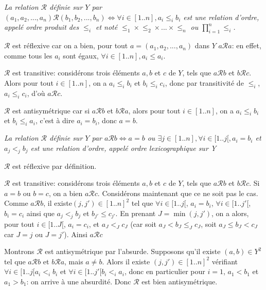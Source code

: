 \documentclass{scrartcl}
\begin{document}
			\prop \textsl{La relation $\mathcal{R}$ définie sur $Y$ par 
				$(a_1,a_2,...,a_n)\mathcal{R}(b_1,b_2,...,b_n) \Leftrightarrow \forall i \in [1..n], a_i\leq_i b_i$
				est une relation d'ordre, appelé ordre produit des $\leq_i$ et 
				noté $\leq_1\times\leq_2\times...\times\leq_n$ ou $\prod_{i=1}^n\leq_i$.}
			\begin{demo}
				\item $\mathcal{R}$ est réflexive car on a bien, pour tout $a = (a_1,a_2,...,a_n)$ dans $Y$
					$a\mathcal{R}a$: en effet, comme tous les $a_i$ sont égaux, $\forall i \in [1..n], a_i \leq a_i$.
				\item $\mathcal{R}$ est transitive: considérons trois éléments $a,b$ et $c$ de $Y$,
					tels que $a\mathcal{R}b$ et $b\mathcal{R}c$. Alors pour tout $i \in [1..n]$, on a $a_i\leq_i b_i$
					et $b_i \leq_i c_i$, donc par transitivité de $\leq_i$, $a_i\leq_i c_i$, d'où $a\mathcal{R}c$.
				\item $\mathcal{R}$ est antisymétrique car si $a\mathcal{R}b$ et $b\mathcal{R}a$,
					alors pour tout $i\in [1..n]$, on a $a_i \leq_i b_i$ et $b_i\leq_i a_i$, c'est à dire
					$a_i = b_i$, donc $a=b$.
			\end{demo}

			\prop \textsl{La relation $\mathcal{R}$ définie sur $Y$ par 
				$a\mathcal{R}b \Leftrightarrow a=b$ ou $\exists j \in [1..n], \forall i \in [1..j[, a_i = b_i$ et
				$a_j <_j b_j$
				est une relation d'ordre, appelé ordre lexicographique sur Y}
			\begin{demo}
				\item $\mathcal{R}$ est réflexive par définition.
				\item $\mathcal{R}$ est transitive: considérons trois éléments $a,b$ et $c$ de $Y$,
					tels que $a\mathcal{R}b$ et $b\mathcal{R}c$. Si $a=b$ ou $b=c$, on a bien $a\mathcal{R}c$.
					Considérons maintenant que ce ne soit pas le cas. Comme $a\mathcal{R}b$, il existe$(j,j')\in[1..n]^2$ tel que 
					$\forall i \in [1..j[$, $a_i = b_i$, $\forall i \in [1..j'[$, $b_i=c_i$ ainsi que $a_j <_j b_j$ et $b_{j'} \leq c_{j'}$.
					En prenant $J = \min(j,j')$, on a alors, pour tout $i \in [1..J[$, $a_i = c_i$, et $a_J <_J c_J$ 
					(car soit $a_J < b_J \leq_J c_J$, soit $a_J \leq b_J < c_J$ car $J = j$ ou $J = j'$).
					Ainsi $a\mathcal{R}c$
				\item Montrons $\mathcal{R}$ est antisymétrique par l'absurde.
					Supposons qu'il existe $(a,b)\in Y^2$ tel que $a\mathcal{R}b$ et $b\mathcal{R}a$, mais $a\neq b$.
					Alors il existe $(j,j')\in[1..n]^2$ vérifiant $\forall i \in [1..j[ a_i <_i b_i$ et $\forall i \in [1..j'[ b_i <_i a_i$,
					donc en particulier pour $i=1$, $a_1 < b_1$ et $a_1 > b_1$: on arrive à une absurdité.
					Donc $\mathcal{R}$ est bien antisymétrique.
			\end{demo}
\end{document}
